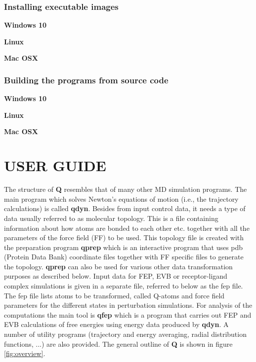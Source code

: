 \documentclass[a4paper,10pt]{article}
\begin{document}
\subsubsection{Installing executable images}
\textbf{Windows 10}

\textbf{Linux}

\textbf{Mac OSX}

\subsubsection{Building the programs from source code}
\textbf{Windows 10}

\textbf{Linux} 

\textbf{Mac OSX}



\section{USER GUIDE}
The structure of \textbf{Q} resembles that of many other MD simulation
programs.  The main program which  solves Newton's equations of motion
(i.e., the  trajectory calculations) is called  \textbf{qdyn}. Besides
from input control  data, it needs a type of  data usually referred to
as molecular topology. This is a file containing information about how
atoms are bonded  to each other etc. together with  all the parameters
of the  force field (FF)  to be used.   This topology file  is created
with the  preparation program  \textbf{qprep} which is  an interactive
program that  uses pdb (Protein  Data Bank) coordinate  files together
with FF  specific files to  generate the topology.  \textbf{qprep} can
also  be  used  for  various other  data  transformation  purposes  as
described below.  Input  data for FEP, EVB  or receptor-ligand complex
simulations is given in a separate  file, referred to below as the fep
file. The fep  file lists atoms to be transformed,  called Q-atoms and
force  field  parameters  for  the different  states  in  perturbation
simulations.  For  analysis  of  the computations  the  main  tool  is
\textbf{qfep}  which  is  a  program  that carries  out  FEP  and  EVB
calculations  of   free  energies   using  energy  data   produced  by
\textbf{qdyn}.  A number  of utility  programs (trajectory  and energy
averaging, radial distribution functions,  ...) are also provided. The
general outline of \textbf{Q} is shown in figure \ref{fig:overview}.
\end{document}

